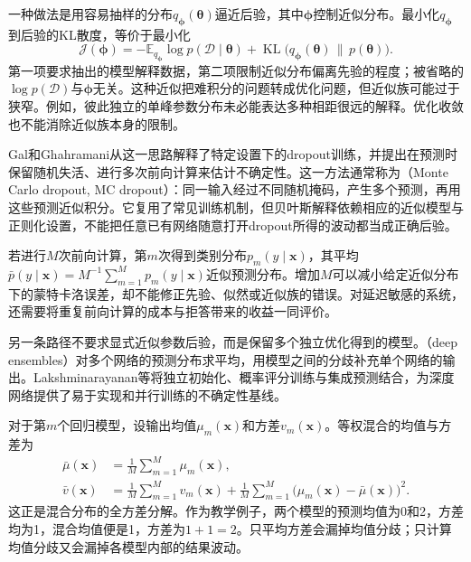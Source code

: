 一种做法是用容易抽样的分布$q_{\bm{\phi}}(\bm{\theta})$逼近后验，其中$\bm{\phi}$控制近似分布。最小化$q_{\bm{\phi}}$到后验的KL散度，等价于最小化
\begin{equation}
 \mathcal J(\bm{\phi})
 =-\mathbb E_{q_{\bm{\phi}}}\log p(\mathcal D\mid\bm{\theta})
   +\operatorname{KL}\bigl(q_{\bm{\phi}}(\bm{\theta})
                    \,\|\,p(\bm{\theta})\bigr).
 \label{eq:reliability-variational-objective}
\end{equation}
第一项要求抽出的模型解释数据，第二项限制近似分布偏离先验的程度；被省略的
$\log p(\mathcal D)$与$\bm{\phi}$无关。这种近似把难积分的问题转成优化问题，但近似族可能过于狭窄。例如，彼此独立的单峰参数分布未必能表达多种相距很远的解释。优化收敛也不能消除近似族本身的限制。

Gal和Ghahramani从这一思路解释了特定设置下的dropout训练，并提出在预测时保留随机失活、进行多次前向计算来估计不确定性。这一方法通常称为（Monte Carlo dropout, MC dropout）：同一输入经过不同随机掩码，产生多个预测，再用这些预测近似积分。它复用了常见训练机制，但贝叶斯解释依赖相应的近似模型与正则化设置，不能把任意已有网络随意打开dropout所得的波动都当成正确后验。

若进行$M$次前向计算，第$m$次得到类别分布$p_m(y\mid\bm{x})$，其平均$\bar p(y\mid\bm{x})=M^{-1}\sum_{m=1}^{M}p_m(y\mid\bm{x})$近似预测分布。增加$M$可以减小给定近似分布下的蒙特卡洛误差，却不能修正先验、似然或近似族的错误。对延迟敏感的系统，还需要将重复前向计算的成本与拒答带来的收益一同评价。

另一条路径不要求显式近似参数后验，而是保留多个独立优化得到的模型。（deep ensembles）对多个网络的预测分布求平均，用模型之间的分歧补充单个网络的输出。Lakshminarayanan等将独立初始化、概率评分训练与集成预测结合，为深度网络提供了易于实现和并行训练的不确定性基线。

对于第$m$个回归模型，设输出均值$\mu_m(\bm{x})$和方差$v_m(\bm{x})$。等权混合的均值与方差为
\begin{equation}
 \begin{aligned}
 \bar\mu(\bm{x})&=\frac1M\sum_{m=1}^{M}\mu_m(\bm{x}),\\
 \bar v(\bm{x})&=\frac1M\sum_{m=1}^{M}v_m(\bm{x})
  +\frac1M\sum_{m=1}^{M}
       \bigl(\mu_m(\bm{x})-\bar\mu(\bm{x})\bigr)^2.
 \end{aligned}
 \label{eq:reliability-ensemble-variance}
\end{equation}
这正是混合分布的全方差分解。作为教学例子，两个模型的预测均值为0和2，方差均为1，混合均值便是1，方差为$1+1=2$。只平均方差会漏掉均值分歧；只计算均值分歧又会漏掉各模型内部的结果波动。

